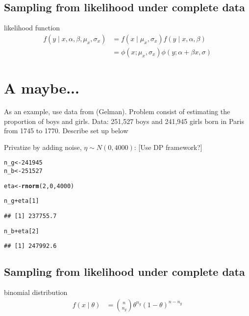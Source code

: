 \documentclass{article}\usepackage[]{graphicx}\usepackage[]{xcolor}
\makeatletter
\newcommand{\hlnum}[1]{\textcolor[rgb]{0.686,0.059,0.569}{#1}}%
\newcommand{\hlopt}[1]{\textcolor[rgb]{0,0,0}{#1}}%
\newcommand{\hlstd}[1]{\textcolor[rgb]{0.345,0.345,0.345}{#1}}%
\newcommand{\hlkwb}[1]{\textcolor[rgb]{0.69,0.353,0.396}{#1}}%
\newcommand{\hlkwd}[1]{\textcolor[rgb]{0.737,0.353,0.396}{\textbf{#1}}}%
\newenvironment{kframe}{%
 \def\at@end@of@kframe{}%
 \ifinner\ifhmode%
  \def\at@end@of@kframe{\end{minipage}}%
  \begin{minipage}{\columnwidth}%
 \fi\fi%
 \def\FrameCommand##1{\hskip\@totalleftmargin \hskip-\fboxsep
 \colorbox{shadecolor}{##1}\hskip-\fboxsep
     \hskip-\linewidth \hskip-\@totalleftmargin \hskip\columnwidth}%
 \MakeFramed {\advance\hsize-\width
   \@totalleftmargin\z@ \linewidth\hsize
   \@setminipage}}%
 {\par\unskip\endMakeFramed%
 \at@end@of@kframe}
\newenvironment{knitrout}{}{} %
\theoremstyle{definition}
\makeatother
\begin{document}
\subsection*{Sampling from likelihood under complete data}
likelihood function
\begin{align*}
f(y \mid x,  \alpha, \beta, \mu_x, \sigma_x) 
&= f(x \mid \mu_x, \sigma_x)f(y \mid x, \alpha, \beta)\\
&= \phi(x; \mu_x, \sigma_x)\phi(y; \alpha + \beta x, \sigma)
\end{align*}


\newpage

\section*{A maybe...}


As an example, use data from (Gelman). Problem
consist of estimating the proportion of boys and girls.
Data: 251,527 boys and 241,945 girls born in Paris
from 1745 to 1770. Describe set up below

Privatize by adding noise, $\eta \sim N(0, 4000)$:
[Use DP framework?]
\begin{knitrout}
\color{fgcolor}\begin{kframe}
\begin{alltt}
\hlstd{n_g} \hlkwb{<-} \hlnum{241945}
\hlstd{n_b} \hlkwb{<-} \hlnum{251527}

\hlstd{eta} \hlkwb{<-} \hlkwd{rnorm}\hlstd{(}\hlnum{2}\hlstd{,}\hlnum{0}\hlstd{,}\hlnum{4000}\hlstd{)}

\hlstd{n_g} \hlopt{+} \hlstd{eta[}\hlnum{1}\hlstd{]}
\end{alltt}
\begin{verbatim}
## [1] 237755.7
\end{verbatim}
\begin{alltt}
\hlstd{n_b} \hlopt{+} \hlstd{eta[}\hlnum{2}\hlstd{]}
\end{alltt}
\begin{verbatim}
## [1] 247992.6
\end{verbatim}
\end{kframe}
\end{knitrout}

\subsection*{Sampling from likelihood under complete data}
binomial distribution
\begin{align*}
f(x \mid \theta) &= \binom{n}{n_g} \theta^{n_g}(1-\theta)^{n-n_g}
\end{align*}
\end{document}

